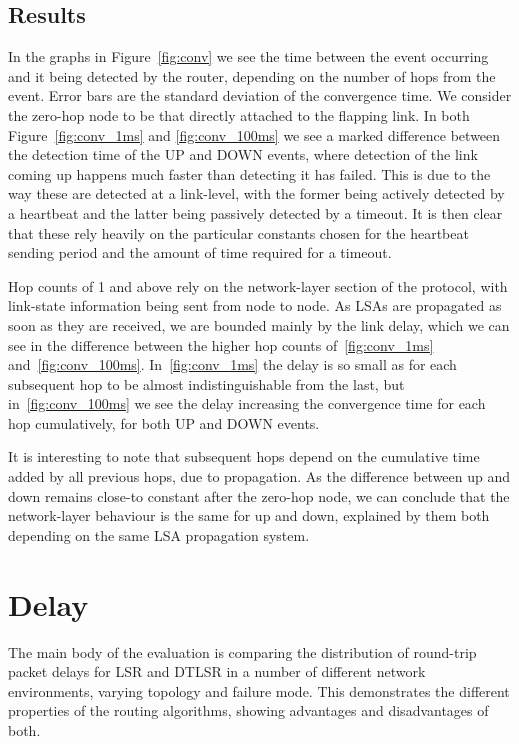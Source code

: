 \documentclass[withindex,glossary,openany]{cam-thesis}
\begin{document}
\subsection{Results}

In the graphs in Figure~\ref{fig:conv} we see the time between the event occurring and it being detected by the router, depending on the number of hops from the event. Error bars are the standard deviation of the convergence time. We consider the zero-hop node to be that directly attached to the flapping link. In both Figure~\ref{fig:conv_1ms} and \ref{fig:conv_100ms} we see a marked difference between the detection time of the UP and DOWN events, where detection of the link coming up happens much faster than detecting it has failed. This is due to the way these are detected at a link-level, with the former being actively detected by a heartbeat and the latter being passively detected by a timeout. It is then clear that these rely heavily on the particular constants chosen for the heartbeat sending period and the amount of time required for a timeout.

Hop counts of 1 and above rely on the network-layer section of the protocol, with link-state information being sent from node to node. As LSAs are propagated as soon as they are received, we are bounded mainly by the link delay, which we can see in the difference between the higher hop counts of~\ref{fig:conv_1ms} and~\ref{fig:conv_100ms}. In~\ref{fig:conv_1ms} the delay is so small as for each subsequent hop to be almost indistinguishable from the last, but in~\ref{fig:conv_100ms} we see the delay increasing the convergence time for each hop cumulatively, for both UP and DOWN events.

It is interesting to note that subsequent hops depend on the cumulative time added by all previous hops, due to propagation. As the difference between up and down remains close-to constant after the zero-hop node, we can conclude that the network-layer behaviour is the same for up and down, explained by them both depending on the same LSA propagation system.


\section{Delay}

The main body of the evaluation is comparing the distribution of round-trip packet delays for LSR and DTLSR in a number of different network environments, varying topology and failure mode. This demonstrates the different properties of the routing algorithms, showing advantages and disadvantages of both.
\end{document}
